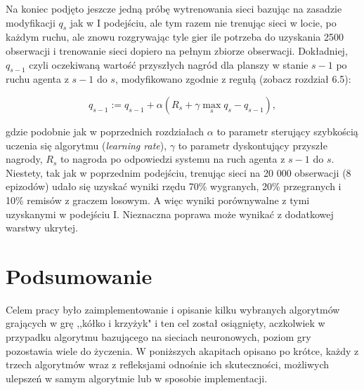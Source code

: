 \documentclass[licencjacka]{pracamgr}
\begin{document}
Na koniec podjęto jeszcze jedną próbę wytrenowania sieci bazując na zasadzie modyfikacji $q_{s}$ jak w I podejściu, ale tym razem nie trenując sieci w locie, po każdym ruchu, ale znowu rozgrywając tyle gier ile potrzeba do uzyskania 2500 obserwacji i trenowanie sieci dopiero na pełnym zbiorze obserwacji. Dokładniej,  $q_{s-1}$ czyli oczekiwaną wartość przyszłych nagród dla planszy w stanie $s-1$ po ruchu agenta z $s-1$ do $s$, modyfikowano zgodnie z regułą (zobacz \cite{RL} rozdział 6.5):

$$q_{s-1} := q_{s-1} + \alpha(R_{s}+\gamma\max_{s}q_{s}-q_{s-1}),$$

gdzie podobnie jak w poprzednich rozdziałach $\alpha$ to parametr sterujący szybkością uczenia się algorytmu (\textit{learning rate}), $\gamma$ to parametr dyskontujący przyszłe nagrody, $R_{s}$ to nagroda po odpowiedzi systemu na ruch agenta z $s-1$ do $s$. Niestety, tak jak w poprzednim podejściu, trenując sieci na 20 000 obserwacji (8 epizodów) udało się uzyskać wyniki rzędu 70\%  wygranych, 20\% przegranych i 10\% remisów z graczem losowym. A więc wyniki porównywalne z tymi uzyskanymi w podejściu I. Nieznaczna poprawa może wynikać z dodatkowej warstwy ukrytej. 
  

\chapter{Podsumowanie}
Celem pracy było zaimplementowanie i opisanie kilku wybranych algorytmów grających w grę ,,kółko i krzyżyk" i ten cel został osiągnięty,  aczkolwiek w przypadku algorytmu bazującego na sieciach neuronowych, poziom gry pozostawia wiele do życzenia.  W poniższych akapitach opisano po krótce, każdy z trzech algorytmów wraz z refleksjami odnośnie ich skuteczności,  możliwych ulepszeń w samym algorytmie lub w sposobie implementacji.\\
\end{document}
